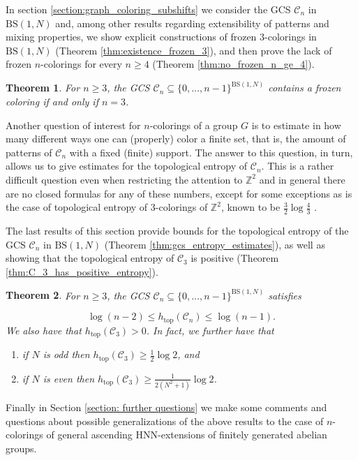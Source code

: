 \documentclass[letterpaper,11pt,reqno]{amsart}
\theoremstyle{plain}
\newtheorem{theorem}{Theorem}[section]
\theoremstyle{definition}
\theoremstyle{cupremark}
\newcommand{\BS}[1][N]{\mathrm{BS}(1,#1)}
\def\htop{h_{\mathrm{top}}}
\begin{document}
In section \ref{section:graph_coloring_subshifts} we consider the GCS $\mathcal{C}_n$ in $\BS$ and, among other results regarding extensibility of patterns and mixing properties, we show explicit constructions of frozen $3$-colorings in $\BS$ (Theorem \ref{thm:existence_frozen_3}), and then prove the lack of frozen $n$-colorings for every $n\ge 4$ (Theorem \ref{thm:no_frozen_n_ge_4}).

\begin{theorem}\label{thm:summary_gcs_frozen_colorings}
	For $n\ge 3$, the GCS $\mathcal{C}_n\subseteq\{0,\ldots,n-1\}^{\BS}$ contains a frozen coloring if and only if $n=3$.
\end{theorem}	

Another question of interest for $n$-colorings of a group $G$ is to estimate in how many different ways one can (properly) color a finite set, that is, the amount of patterns of $\mathcal{C}_n$ with a fixed (finite) support. The answer to this question, in turn, allows us to give estimates for the topological entropy of $\mathcal{C}_n$. This is a rather difficult question even when restricting the attention to $\mathbb{Z}^2$ and in general there are no closed formulas for any of these numbers, except for some exceptions as is the case of topological entropy of $3$-colorings of $\mathbb{Z}^2$, known to be $\frac{3}{2}\log\frac{4}{3}$ \cite{Lieb:1967zz}.


The last results of this section provide bounds for the topological entropy of the GCS $\mathcal{C}_n$ in $\BS$ (Theorem \ref{thm:gcs_entropy_estimates}), as well as showing that the topological entropy of $\mathcal{C}_3$ is positive (Theorem \ref{thm:C_3_has_positive_entropy}).
\begin{theorem} \label{thm:summary_gcs_entropy}
	For $n\ge 3$, the GCS $\mathcal{C}_n\subseteq\{0,\ldots,n-1\}^{\BS}$ satisfies
	
	$$
	\log(n-2)\le\htop(\mathcal{C}_n)\le\log(n-1).
	$$
	We also have that $\htop(\mathcal{C}_3)>0$. In fact, we further have that
	\begin{enumerate}
		\item if $N$ is odd then $\htop(\mathcal{C}_3)\ge\frac{1}{2}\log 2$, and
		\item if $N$ is even then $\htop(\mathcal{C}_3)\ge\frac{1}{2(N^2+1)}\log 2$.
	\end{enumerate}
\end{theorem}

Finally in Section \ref{section: further questions} we make some comments and questions about possible generalizations of the above results to the case of $n$-colorings of general ascending HNN-extensions of finitely generated abelian groups.
\end{document}

